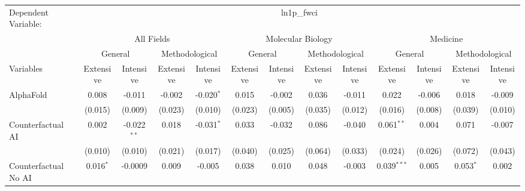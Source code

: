 \begingroup
\centering
\begin{tabular}{lcccccccccccc}
   \tabularnewline \midrule \midrule
   Dependent Variable: & \multicolumn{12}{c}{ln1p\_fwci}\\
 & \multicolumn{4}{c}{All Fields} & \multicolumn{4}{c}{Molecular Biology} & \multicolumn{4}{c}{Medicine} \\
\cmidrule(lr){2-5} \cmidrule(lr){6-9} \cmidrule(lr){10-13}
 & \multicolumn{2}{c}{General} & \multicolumn{2}{c}{Methodological} & \multicolumn{2}{c}{General} & \multicolumn{2}{c}{Methodological} & \multicolumn{2}{c}{General} & \multicolumn{2}{c}{Methodological} \\
\cmidrule(lr){2-3} \cmidrule(lr){4-5} \cmidrule(lr){6-7} \cmidrule(lr){8-9} \cmidrule(lr){10-11} \cmidrule(lr){12-13}
Variables & \multicolumn{1}{c}{Extensive} & \multicolumn{1}{c}{Intensive} & \multicolumn{1}{c}{Extensive} & \multicolumn{1}{c}{Intensive} & \multicolumn{1}{c}{Extensive} & \multicolumn{1}{c}{Intensive} & \multicolumn{1}{c}{Extensive} & \multicolumn{1}{c}{Intensive} & \multicolumn{1}{c}{Extensive} & \multicolumn{1}{c}{Intensive} & \multicolumn{1}{c}{Extensive} & \multicolumn{1}{c}{Intensive} \\
\cmidrule(lr){1-1}\cmidrule(lr){2-2} \cmidrule(lr){3-3} \cmidrule(lr){4-4} \cmidrule(lr){5-5} \cmidrule(lr){6-6} \cmidrule(lr){7-7} \cmidrule(lr){8-8} \cmidrule(lr){9-9} \cmidrule(lr){10-10} \cmidrule(lr){11-11} \cmidrule(lr){12-12} \cmidrule(lr){13-13}
   AlphaFold                                & 0.008       & -0.011        & -0.002  & -0.020$^{*}$ & 0.015         & -0.002  & 0.036         & -0.011  & 0.022         & -0.006  & 0.018       & -0.009\\   
                                            & (0.015)     & (0.009)       & (0.023) & (0.010)      & (0.023)       & (0.005) & (0.035)       & (0.012) & (0.016)       & (0.008) & (0.039)     & (0.010)\\   
   Counterfactual AI                        & 0.002       & -0.022$^{**}$ & 0.018   & -0.031$^{*}$ & 0.033         & -0.032  & 0.086         & -0.040  & 0.061$^{**}$  & 0.004   & 0.071       & -0.007\\   
                                            & (0.010)     & (0.010)       & (0.021) & (0.017)      & (0.040)       & (0.025) & (0.064)       & (0.033) & (0.024)       & (0.026) & (0.072)     & (0.043)\\   
   Counterfactual No AI                     & 0.016$^{*}$ & -0.0009       & 0.009   & -0.005       & 0.038         & 0.010   & 0.048         & -0.003  & 0.039$^{***}$ & 0.005   & 0.053$^{*}$ & 0.002\\   

\end{tabular}
